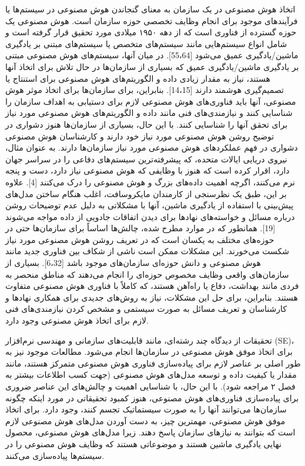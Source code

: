 \documentclass[a4paper,10pt]{article}
\begin{document}
        اتخاذ هوش مصنوعی در یک سازمان به معنای گنجاندن هوش مصنوعی در سیستم‌ها یا فرآیندهای موجود برای انجام وظایف تخصصی حوزه سازمان است. هوش مصنوعی یک حوزه گسترده از فناوری است که از دهه ۱۹۵۰ میلادی مورد تحقیق قرار گرفته است و شامل انواع سیستم‌هایی مانند سیستم‌های متخصص یا سیستم‌های مبتنی بر یادگیری ماشین/یادگیری عمیق می‌شود [55،64]. در میان آنها، سیستم‌های هوش مصنوعی مبتنی بر یادگیری ماشین/یادگیری عمیق که بسیاری از سازمان‌ها در حال تلاش برای اتخاذ آنها هستند، نیاز به مقدار زیادی داده و الگوریتم‌های هوش مصنوعی برای استنتاج یا تصمیم‌گیری هوشمند دارند [14،15]. بنابراین، برای سازمان‌ها برای اتخاذ موثر هوش مصنوعی، آنها باید فناوری‌های هوش مصنوعی لازم برای دستیابی به اهداف سازمان را شناسایی کنند و نیازمندی‌های فنی مانند داده و الگوریتم‌های هوش مصنوعی مورد نیاز برای تحقق آنها را شناسایی کنند. با این حال، بسیاری از سازمان‌ها هنوز دشواری در توضیح روشن هوش مصنوعی مورد نیاز خود دارند و کارشناسان هوش مصنوعی دشواری در فهم عملکردهای هوش مصنوعی مورد نیاز سازمان‌ها دارند. به عنوان مثال، نیروی دریایی ایالات متحده، که پیشرفته‌ترین سیستم‌های دفاعی را در سراسر جهان دارد، اقرار کرده است که هنوز با وظایفی که هوش مصنوعی نیاز دارد، دست و پنجه نرم می‌کنند، اگرچه اهمیت داده‌های بزرگ و هوش مصنوعی را درک می‌کنند [4]. علاوه بر این، طبق یک نظرسنجی از کارمندان مایکروسافت، اغلب هنگام ساختن مدل‌های پیش‌بینی با استفاده از یادگیری ماشین، آنها با مشکلاتی به دلیل عدم توضیحات روشن درباره مسائل و خواسته‌های نهادها برای دیدن اتفاقات جادویی از داده مواجه می‌شوند [19]. همانطور که در موارد مطرح شده، چالش‌ها اساساً برای سازمان‌ها حتی در حوزه‌های مختلف به یکسان است که در تعریف روشن هوش مصنوعی مورد نیاز شکست می‌خورند. این مشکلات ممکن است ناشی از شکاف بین فناوری جدید مانند هوش مصنوعی و دانش حوزه‌ای سازمان‌های موجود باشد [6،32]. بسیاری از سازمان‌های واقعی وظایف مخصوص حوزه‌ای را انجام می‌دهند که مناطق منحصر به فردی مانند بهداشت، دفاع یا راه‌آهن هستند، که کاملاً با فناوری هوش مصنوعی متفاوت هستند. بنابراین، برای حل این مشکلات، نیاز به روش‌های جدیدی برای همکاری نهادها و کارشناسان و تعریف مسائل به صورت سیستمی و مشخص کردن نیازمندی‌های فنی لازم برای اتخاذ هوش مصنوعی وجود دارد.

        تحقیقات از دیدگاه چند رشته‌ای، مانند قابلیت‌های سازمانی و مهندسی نرم‌افزار (SE)، برای اتخاذ موفق هوش مصنوعی در سازمان‌ها انجام می‌شود. مطالعات موجود نیز به طور اصلی بر عناصر لازم برای پیاده‌سازی فناوری هوش مصنوعی متمرکز هستند، مانند مقدار یا کیفیت داده و توسعه مدل‌های هوش مصنوعی (جهت کسب اطلاعات بیشتر به فصل ۲ مراجعه شود). با این حال، با شناسایی اهمیت و چالش‌های این عناصر ضروری برای پیاده‌سازی فناوری‌های هوش مصنوعی، هنوز کمبود تحقیقاتی در مورد اینکه چگونه سازمان‌ها می‌توانند آنها را به صورت سیستماتیک تجسم کنند، وجود دارد. برای اتخاذ موفق هوش مصنوعی، مهمترین چیز، به دست آوردن مدل‌های هوش مصنوعی لازم است که بتوانند به نیازهای سازمان پاسخ دهند. زیرا مدل‌های هوش مصنوعی، محصول نهایی یادگیری ماشین هستند و موضوعاتی هستند که وظایف هوش مصنوعی را در سیستم‌ها پیاده‌سازی می‌کنند.
\end{document}
